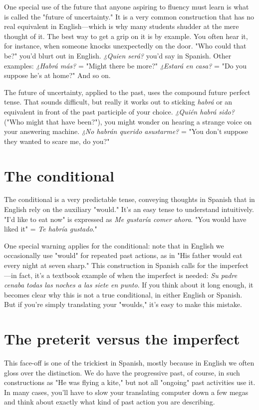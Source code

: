 \documentclass[14pt,a4paper,oneside]{memoir}
\begin{document}
One special use of the future that anyone aspiring to fluency
must learn is what is called the "future of uncertainty." It is a very
common construction that has no real equivalent in English---which is
why many students shudder at the mere thought of it. The best way to
get a grip on it is by example. You often hear it, for instance, when
someone knocks unexpectedly on the door. "Who could that be?"
you'd blurt out in English. \emph{¿Quien será?} you'd say in Spanish. Other
examples: \emph{¿Habrá más?} = "Might there be more?" \emph{¿Estará en casa?} =
"Do you suppose he's at home?" And so on.

The future of uncertainty, applied to the past, uses the compound future perfect tense. That sounds difficult, but really it works
out to sticking \emph{habrá} or an equivalent in front of the past participle of
your choice. \emph{¿Quién habrá sido?} ("Who might that have been?"), you
might wonder on hearing a strange voice on your answering machine.
\emph{¿No habrán querido asustarme?} = "You don't suppose they wanted to
scare me, do you?"

\section{The conditional}

The conditional is a very predictable tense, conveying
thoughts in Spanish that in English rely on the auxiliary "would." It's
an easy tense to understand intuitively. "I'd like to eat now" is expressed as \emph{Me gustaría comer ahora}. "You would have liked it" = \emph{Te habría gustado}."

One special warning applies for the conditional: note that in
English we occasionally use "would" for repeated past actions, as in
"His father would eat every night at seven sharp." This construction
in Spanish calls for the imperfect---in fact, it's a textbook example of
when the imperfect is needed: \emph{Su padre cenaba todas las noches a las
siete en punto}. If you think about it long enough, it becomes clear why
this is not a true conditional, in either English or Spanish. But if you're
simply translating your "woulds," it's easy to make this mistake.

\section{The preterit versus the imperfect}

This face-off is one of the trickiest in Spanish, mostly because
in English we often gloss over the distinction. We do have the progressive past, of course, in such constructions as "He was flying a kite,"
but not all "ongoing" past activities use it. In many cases, you'll have
to slow your translating computer down a few megas and think about
exactly what kind of past action you are describing.
\end{document}
